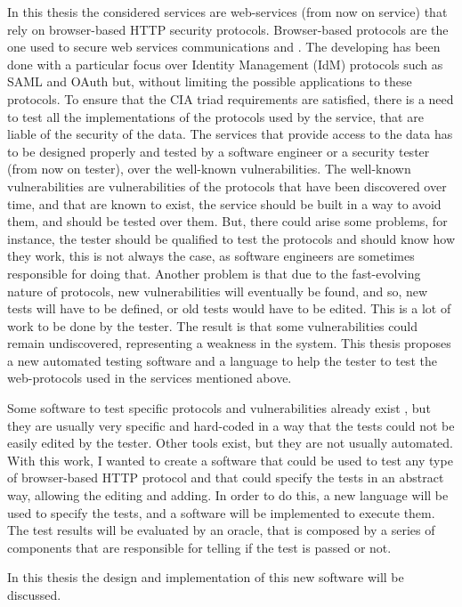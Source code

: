 In this thesis the considered services are web-services (from now on service) that rely on browser-based HTTP security protocols. Browser-based protocols are the one used to secure web services communications and . The developing has been done with a particular focus over Identity Management (IdM) protocols such as \gls{SAML} and \gls{OAuth} but, without limiting the possible applications to these protocols.
To ensure that the CIA triad requirements are satisfied, there is a need to test all the implementations of the protocols used by the service, that are liable of the security of the data. The services that provide access to the data has to be designed properly and tested by a software engineer or a security tester (from now on tester), over the well-known vulnerabilities. The well-known vulnerabilities are vulnerabilities of the protocols that have been discovered over time, and that are known to exist, the service should be built in a way to avoid them, and should be tested over them. But, there could arise some problems, for instance, the tester should be qualified to test the protocols and should know how they work, this is not always the case, as software engineers are sometimes responsible for doing that. Another problem is that due to the fast-evolving nature of protocols, new vulnerabilities will eventually be found, and so, new tests will have to be defined, or old tests would have to be edited. This is a lot of work to be done by the tester. The result is that some vulnerabilities could remain undiscovered, representing a weakness in the system. This thesis proposes a new automated testing software and a language to help the tester to test the web-protocols used in the services mentioned above. 

Some software to test specific protocols and vulnerabilities already exist \cite{wendy_barreto,claudio_grisenti}, but they are usually very specific and hard-coded in a way that the tests could not be easily edited by the tester. Other tools exist, but they are not usually automated. With this work, I wanted to create a software that could be used to test any type of browser-based HTTP protocol and that could specify the tests in an abstract way, allowing the editing and adding. In order to do this, a new language will be used to specify the tests, and a software will be implemented to execute them. The test results will be evaluated by an oracle, that is composed by a series of components that are responsible for telling if the test is passed or not.

In this thesis the design and implementation of this new software will be discussed.

